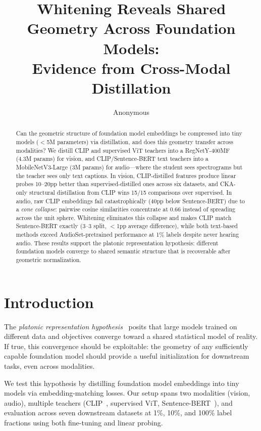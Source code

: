 \documentclass{article}
\title{Whitening Reveals Shared Geometry Across Foundation Models:\\Evidence from Cross-Modal Distillation}
\author{
  Anonymous
}
\begin{document}
\maketitle

\begin{abstract}
Can the geometric structure of foundation model embeddings be compressed into tiny models ($<$5M parameters) via distillation, and does this geometry transfer across modalities?
We distill CLIP and supervised ViT teachers into a RegNetY-400MF (4.3M params) for vision, and CLIP/Sentence-BERT text teachers into a MobileNetV3-Large (3M params) for audio---where the student sees spectrograms but the teacher sees only text captions.
In vision, CLIP-distilled features produce linear probes 10--20pp better than supervised-distilled ones across six datasets, and CKA-only structural distillation from CLIP wins 15/15 comparisons over supervised.
In audio, raw CLIP embeddings fail catastrophically (40pp below Sentence-BERT) due to a \emph{cone collapse}: pairwise cosine similarities concentrate at 0.66 instead of spreading across the unit sphere.
Whitening eliminates this collapse and makes CLIP match Sentence-BERT exactly (3--3 split, $<$1pp average difference), while both text-based methods exceed AudioSet-pretrained performance at 1\% labels despite never hearing audio.
These results support the platonic representation hypothesis: different foundation models converge to shared semantic structure that is recoverable after geometric normalization.
\end{abstract}

\section{Introduction}
\label{sec:intro}

The \emph{platonic representation hypothesis}~\citep{huh2024platonic} posits that large models trained on different data and objectives converge toward a shared statistical model of reality.
If true, this convergence should be exploitable: the geometry of any sufficiently capable foundation model should provide a useful initialization for downstream tasks, even across modalities.

We test this hypothesis by distilling foundation model embeddings into tiny models via embedding-matching losses.
Our setup spans two modalities (vision, audio), multiple teachers (CLIP~\citep{radford2021learning}, supervised ViT, Sentence-BERT~\citep{reimers2019sentence}), and evaluation across seven downstream datasets at 1\%, 10\%, and 100\% label fractions using both fine-tuning and linear probing.
\end{document}
